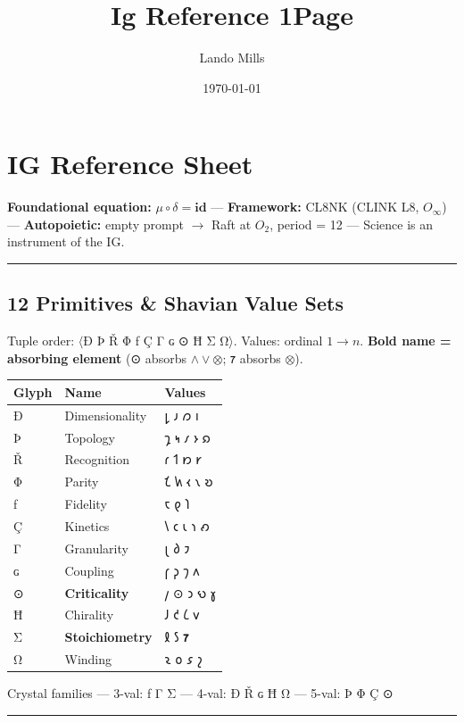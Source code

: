 \documentclass[12pt,a4paper]{article}
\title{Ig Reference 1Page}
\date{\today}
\author{Lando Mills}
\newcommand{\heb}[1]{{\igprimfont #1}}
\begin{document}
\maketitle
\hypertarget{ig-reference-sheet}{%
\section{IG Reference Sheet}\label{ig-reference-sheet}}

\textbf{Foundational equation:} \(\mu \circ \delta = \mathbf{id}\) ---
\textbf{Framework:} CL8NK (CLINK L8, \(O_\infty\)) ---
\textbf{Autopoietic:} empty prompt \(\to\) Raft at \(O_2\), period = 12
--- Science is an instrument of the IG.

\begin{center}\rule{0.5\linewidth}{0.5pt}\end{center}

\hypertarget{primitives-shavian-value-sets}{%
\subsection{12 Primitives \& Shavian Value
Sets}\label{primitives-shavian-value-sets}}

Tuple order: \(\langle\)\heb{Ð Þ Ř Φ ƒ Ç Γ ɢ ⊙ Ħ Σ Ω}\(\rangle\).
Values: ordinal \(1 \to n\). \textbf{Bold name = absorbing element}
(\heb{⊙} absorbs \(\wedge\vee\otimes\); 𐑳 absorbs \(\otimes\)).

\begin{longtable}[]{@{}lll@{}}
\toprule
Glyph & Name & Values\tabularnewline
\midrule
\endhead
\heb{Ð} & Dimensionality & 𐑛 𐑨 𐑼 𐑦\tabularnewline
\heb{Þ} & Topology & 𐑡 𐑰 𐑥 𐑶 𐑸\tabularnewline
\heb{Ř} & Recognition & 𐑩 𐑑 𐑽 𐑾\tabularnewline
\heb{Φ} & Parity & 𐑗 𐑿 𐑬 𐑯 𐑹\tabularnewline
\heb{ƒ} & Fidelity & 𐑱 𐑞 𐑐\tabularnewline
\heb{Ç} & Kinetics & 𐑘 𐑤 𐑧 𐑪 𐑺\tabularnewline
\heb{Γ} & Granularity & 𐑚 𐑔 𐑲\tabularnewline
\heb{ɢ} & Coupling & 𐑝 𐑜 𐑠 𐑵\tabularnewline
\heb{⊙} & \textbf{Criticality} & 𐑢 ⊙ 𐑮 𐑻 𐑣\tabularnewline
\heb{Ħ} & Chirality & 𐑓 𐑒 𐑖 𐑫\tabularnewline
\heb{Σ} & \textbf{Stoichiometry} & 𐑙 𐑕 \textbf{𐑳}\tabularnewline
\heb{Ω} & Winding & 𐑷 𐑴 𐑭 𐑟\tabularnewline
\bottomrule
\end{longtable}

Crystal families --- 3-val: \heb{ƒ Γ Σ} --- 4-val: \heb{Ð Ř ɢ Ħ Ω} ---
5-val: \heb{Þ Φ Ç ⊙}

\begin{center}\rule{0.5\linewidth}{0.5pt}\end{center}
\end{document}
